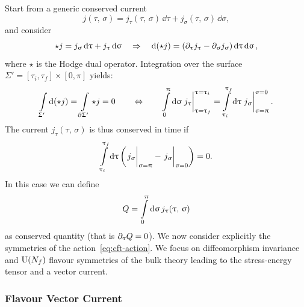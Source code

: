 Start from a generic conserved current
\begin{equation}
  j( \tau,\, \sigma )
  =
  j_{\tau}( \tau,\, \sigma )\, \dd{\tau} + j_{\sigma}( \tau,\, \sigma )\, \dd{\sigma},
\end{equation}
and consider
\begin{equation}
  \star j
  =
  j_{\upsigma} \dd{\ensuremath{\uptau}} + j_{\uptau} \dd{\ensuremath{\upsigma}}
  \quad
  \Rightarrow
  \quad
  \dd{(\star j)}
  =
  \qty( \partial_{\uptau} j_{\uptau} - \partial_{\upsigma} j_{\upsigma} ) \dd{\ensuremath{\uptau}} \dd{\ensuremath{\upsigma}},
\end{equation}
where $\star$ is the Hodge dual operator.
Integration over the surface $\Sigma' = [ \tau_i, \tau_f ] \times [ 0, \pi ]$ yields:
\begin{equation}
  \int\limits_{\Sigma'} \dd{(\star j)}
  =
  \int\limits_{\pd \Sigma'}
  \star j
  =
  0
  \qquad
  \Leftrightarrow
  \qquad
  \finiteint{\sigma}{0}{\pi}
  \eval{j_{\tau}}_{\tau = \tau_f}^{\tau = \tau_i}
  =
  \finiteint{\tau}{\tau_i}{\tau_f}
  \eval{j_{\sigma}}_{\sigma = \pi}^{\sigma = 0}.
\end{equation}
The current $j_{\tau}( \tau,\, \sigma )$ is thus conserved in time if
\begin{equation}
  \finiteint{\tau}{\tau_i}{\tau_f}
  \qty( \eval{j_{\sigma}}_{\sigma = \pi} - \eval{j_{\sigma}}_{\sigma = 0} )
  =
  0.
  \label{eq:time-conservation}
\end{equation}
In this case we can define
\begin{equation}
  Q = \int\limits_{0}^{\uppi} \dd{\ensuremath{\upsigma}} j_{\uptau}( \uptau,\, \upsigma ) 
\end{equation}
as conserved quantity (that is $\partial_{\uptau} Q = 0$).
We now consider explicitly the symmetries of the action~\eqref{eq:cft-action}.
We focus on diffeomorphism invariance and $\mathrm{U}(N_f)$ flavour symmetries of the bulk theory leading to the stress-energy tensor and a vector current.


\subsubsection{Flavour Vector Current}

